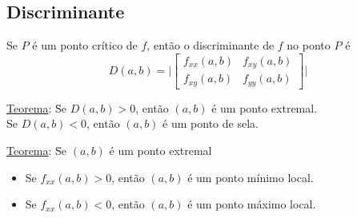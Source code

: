 \documentclass{article}
\begin{document}
\subsection{Discriminante}
Se $P$ é um ponto crítico de $f$, então o discriminante de $f$ no ponto $P$ é
\[
  D(a,b) = \Bigg | \begin{bmatrix}
                    f_{xx}(a,b) & f_{xy}(a,b) \\
                    f_{xy}(a,b) & f_{yy}(a,b)
                   \end{bmatrix} \Bigg |
\]
\begin{tabbing}
  \uline{Teorema}: \= Se $D(a,b) > 0$, então $(a,b)$ é um ponto extremal. \\[5pt]
  \> Se $D(a,b) < 0$, então $(a,b)$ é um ponto de sela.
\end{tabbing}
\begin{tabbing}
  \uline{Teorema}: \= Se $(a,b)$ é um ponto extremal \\[5pt]
  \>\begin{minipage}{\linewidth}
      \begin{itemize}
        \setlength\itemsep{2px}
        \item Se $f_{xx}(a,b) > 0$, então $(a,b)$ é um ponto mínimo local.
        \item Se $f_{xx}(a,b) < 0$, então $(a,b)$ é um ponto máximo local.
      \end{itemize}
    \end{minipage}
\end{tabbing}


\pagebreak
\end{document}

